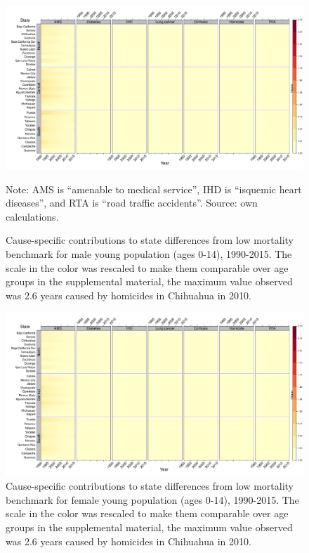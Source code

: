 \documentclass[11.5pt]{article}
\begin{document}
{\begin{figure}
\centering
\caption{Cause-specific contributions to state differences from low mortality benchmark for male young population (ages 0-14), 1990-2015. The scale in the color was rescaled to make them comparable over age groups in the supplemental material, the maximum value observed was 2.6 years caused by homicides in Chihuahua in 2010.}
\label{fig:e0_14_males}
\includegraphics[scale=.3]{Young_Male_heatmap.pdf}

Note: AMS is ``amenable to medical service'', IHD is ``isquemic heart diseases'', and RTA is ``road traffic accidents''. Source: own calculations.\end{figure}

\begin{figure}
\centering
\caption{Cause-specific contributions to state differences from low mortality benchmark for female young population (ages 0-14), 1990-2015. The scale in the color was rescaled to make them comparable over age groups in the supplemental material, the maximum value observed was 2.6 years caused by homicides in Chihuahua in 2010.}
\label{fig:e0_14_females}
\includegraphics[scale=.3]{Young_Female_heatmap.pdf}


\end{figure}}
\end{document}
